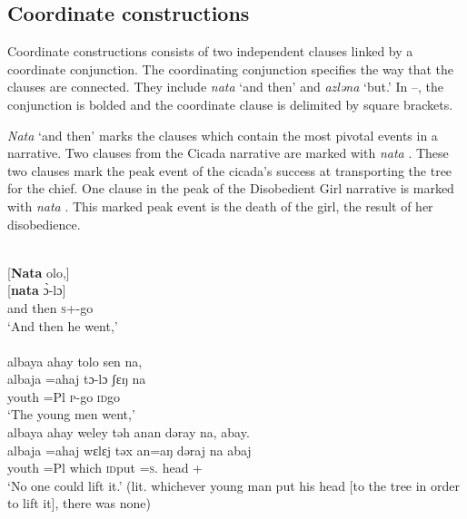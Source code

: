 \subsection{Coordinate constructions}\label{sec:12.3.3}
\hypertarget{RefHeading1213481525720847}{}
\largerpage
Coordinate constructions consists of two independent clauses linked by a coordinate conjunction. The coordinating conjunction specifies the way that the clauses are connected. They include \textit{nata} ‘and then’ and \textit{azləna} ‘but.’ In --, the conjunction is bolded and the coordinate clause is delimited by square brackets. 

\textit{Nata} ‘and then’ marks the clauses which contain the most pivotal events in a narrative. Two clauses from the Cicada narrative are marked with \textit{nata} . These two clauses mark the peak event of the cicada’s success at transporting the tree for the chief. One clause in the peak of the Disobedient Girl narrative is marked with \textit{nata} . This marked peak event is the death of the girl, the result of her disobedience. 

\ea \label{ex:12:51}\\
{}[\textbf{Nata}  olo,]\\ 
\gll  {}[\textbf{nata} \`{ɔ}-lɔ] \\ 
      {and then}     \textsc{s}+{\PFV}-go \\ 
\glt  ‘And then he went,’ \\

\medskip
{}\\
albaya  ahay  tolo  sen  na,\\ 
\gll albaja =ahaj tɔ-lɔ ʃɛŋ na\\ 
     youth =Pl \textsc{p}-go \textsc{id}go {\PSP}\\ 
\glt ‘The young men went,’\\

\medskip
albaya  ahay  weley  təh  anan  dəray  na,  abay.\\  
\gll albaja =ahaj wɛlɛj təx an=aŋ dəraj na abaj\\
     youth =Pl which \textsc{id}put   {\DAT}=\textsc{s}.{\IO}   head   {\PSP}   {{\EXT}+{\NEG}} \\
\glt ‘No one could lift it.’ (lit. whichever young man put his head [to the tree in order to lift it], there was none) \\

